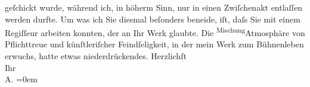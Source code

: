 \begin{ledgroupsized}[t]{13cm}
               geſchickt wurde, während ich, in höherm Sinn, nur in einen Zwiſchenakt entlaſſen
               werden durfte. Um was ich Sie diesmal beſonders beneide, iſt, daſs Sie mit einem Regiſſeur arbeiten konnten, der
               an Ihr Werk glaubte. Die \substVorne{}\textsuperscript{Mischung}{\allowbreak}\substDazwischen{}Atmosphäre\substHinten{} von Pflichttreue und künſtleriſcher Feindſeligkeit, in der  mein Werk zum Bühnenleben erwuchs, hatte {\pb}etwas niederdrückendes.\pend
           \pstart
           Herzlichſt{\\[\baselineskip]}Ihr{\\[\baselineskip]}\spacefill\mbox{A.}\pend
           \leftskip=0em{}\endnumbering{}\end{ledgroupsized}  \newcommand{\dateiname}{L01587}\newcommand{\titel}{Arthur Schnitzler an Hugo von Hofmannsthal, 6. 3. 1906}\newcommand{\editorInnen}{Martin Anton Müller und Gerd-Hermann Susen}
            \footnotesize
\begin{ledgroupsized}[t]{11.5cm}
\end{ledgroupsized}
         
      